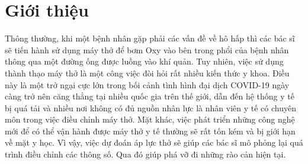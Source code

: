 \documentclass{article}
\begin{document}
\section{Giới thiệu} 





Thông thường, khi một bệnh nhân gặp phải các vấn đề về hô hấp thì các bác sĩ sẽ tiến hành sử dụng máy thở để bơm Oxy vào bên trong phổi của bệnh nhân thông qua một đường ống được luồng vào khí quản. Tuy nhiên, việc sử dụng thành thạo máy thở là một công việc đòi hỏi rất nhiều kiến thức y khoa. Điều này là một trở ngại cực lớn trong bối cảnh tình hình đại dịch COVID-19 ngày càng trở nên căng thẳng tại nhiều quốc gia trên thế giới, dẫn đến hệ thống y tế bị quá tải và nhiều nơi không có đủ nguồn nhân lực là nhân viên y tế có chuyên môn trong việc điều chỉnh máy thở. Mặt khác, việc phát triển những công nghệ mới để có thể vận hành được máy thở y tế thường sẽ rất tốn kém và bị giới hạn về mặt y học. Vì vậy, việc dự đoán áp lực thở sẽ giúp các bác sĩ mô phỏng lại quá trình điều chỉnh các thông số. Qua đó giúp phá vỡ đi những rào cản hiện tại.
\end{document}
